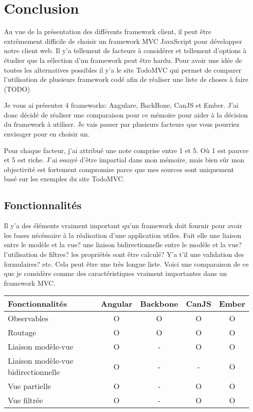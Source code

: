\section{Conclusion}
\label{ch:conclusion client}

Au vue de la présentation des différents framework client, il peut être extrêmement difficile de choisir un framework MVC JavaScript pour développer notre client web. Il y’a tellement de facteurs à considérer et tellement d’options à étudier que la sélection d’un framework peut être hardu. Pour avoir une idée de toutes les alternatives possibles il y’a le site TodoMVC qui permet de comparer l’utilisation de plusieurs framework codé afin de réaliser une liste de choses à faire (TODO)

Je vous ai présenter 4 frameworks: Angulare, BackBone, CanJS et Ember. J’ai donc décidé de réaliser une comparaison pour ce mémoire pour aider à la décision du framework à utiliser. Je vais passer par plusieurs facteurs que vous pourriez envisager pour en choisir un.

Pour chaque facteur, j’ai attribué une note comprise entre 1 et 5. Où 1 est pauvre et 5 est riche. J’ai essayé d’être impartial dans mon mémoire, mais bien sûr mon objectivité est fortement compromise parce que mes sources sont uniquement basé sur les exemples du site TodoMVC.


\subsection{Fonctionnalités}

Il y’a des éléments vraiment important qu’un framework doit fournir pour avoir les bases nécéssaire à la réalisation d’une application utiles. Fait elle une liaison entre le modèle et la vue? une liaison bidirectionnelle entre le modèle et la vue? l’utilisation de filtres? les propriétés sont être calculé? Y’a t’il une validation des formulaires? etc. Cela peut être une très longue liste. Voici une comparaison de ce que je considère comme des caractéristiques vraiment importantes dans un framework MVC.


\begin{tabular}{|l|c|c|c|c|}
  \hline 
  Fonctionnalités & Angular & Backbone & CanJS & Ember \\
  \hline 
  Observables & O & O & O & O \\
  \hline 
  Routage & O & O & O & O \\
  \hline 
  Liaison modèle-vue & O & - & O & O \\
  \hline 
  Liaison modèle-vue bidirectionnelle & O & - & - & O \\
  \hline 
  Vue partielle & O & - & O & O \\
  \hline 
  Vue filtrée & O & - & O & O \\
  \hline
\end{tabular}

